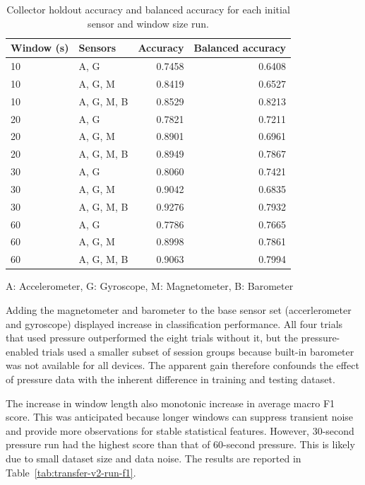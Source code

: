 \begin{table}[htbp]
\centering
\caption{Collector holdout accuracy and balanced accuracy for each initial sensor and window size run.}
\label{tab:transfer-v2-run-accuracy}
\begin{threeparttable}
\small
\begin{tabular}{llrr}
\hline
\textbf{Window (s)} & \textbf{Sensors}\tnote{1} & \textbf{Accuracy} & \textbf{Balanced accuracy} \\
\hline
10 & A, G & 0.7458 & 0.6408 \\
10 & A, G, M & 0.8419 & 0.6527 \\
10 & A, G, M, B & 0.8529 & 0.8213 \\
20 & A, G & 0.7821 & 0.7211 \\
20 & A, G, M & 0.8901 & 0.6961 \\
20 & A, G, M, B & 0.8949 & 0.7867 \\
30 & A, G & 0.8060 & 0.7421 \\
30 & A, G, M & 0.9042 & 0.6835 \\
30 & A, G, M, B & 0.9276 & 0.7932 \\
60 & A, G & 0.7786 & 0.7665 \\
60 & A, G, M & 0.8998 & 0.7861 \\
60 & A, G, M, B & 0.9063 & 0.7994 \\
\hline
\end{tabular}
\begin{tablenotes}
\item[1] A: Accelerometer, G: Gyroscope, M: Magnetometer, B: Barometer
\end{tablenotes}
\end{threeparttable}
\end{table}

Adding the magnetometer and barometer to the base sensor set (accerlerometer and gyroscope) displayed increase in classification performance.  All four trials that used pressure outperformed the eight trials without it, but the pressure-enabled trials used a smaller subset of session groups because built-in barometer was not available for all devices. The apparent gain therefore confounds the effect of pressure data with the inherent difference in training and testing dataset.

The increase in window length also monotonic increase in average macro F1 score. This was anticipated because longer windows can suppress transient noise and provide more observations for stable statistical features. However, 30-second pressure run had the highest score than that of 60-second pressure. This is likely due to small dataset size and data noise. The results are reported in Table~\ref{tab:transfer-v2-run-f1}.

